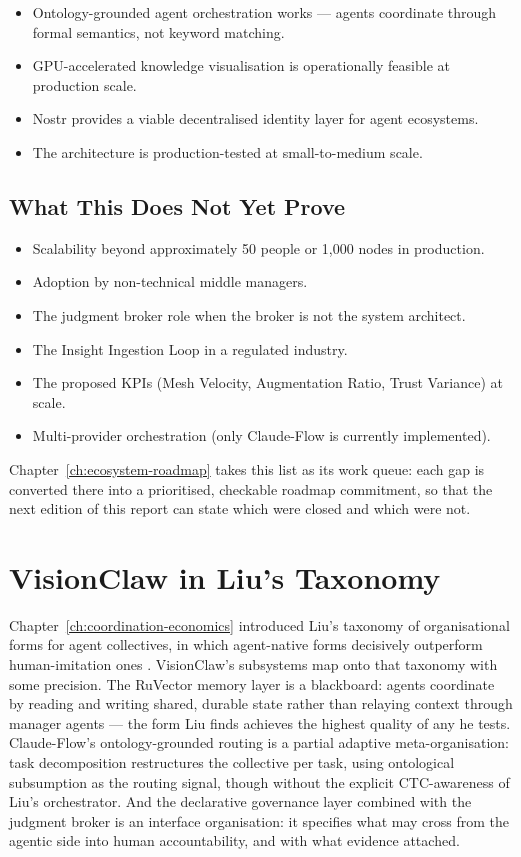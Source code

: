 \begin{itemize}
  \item Ontology-grounded agent orchestration works --- agents coordinate through formal semantics, not keyword matching.
  \item GPU-accelerated knowledge visualisation is operationally feasible at production scale.
  \item Nostr provides a viable decentralised identity layer for agent ecosystems.
  \item The architecture is production-tested at small-to-medium scale.
\end{itemize}

\subsection{What This Does Not Yet Prove}

\begin{itemize}
  \item Scalability beyond approximately 50 people or 1,000 nodes in production.
  \item Adoption by non-technical middle managers.
  \item The judgment broker role when the broker is not the system architect.
  \item The Insight Ingestion Loop in a regulated industry.
  \item The proposed KPIs (Mesh Velocity, Augmentation Ratio, Trust Variance) at scale.
  \item Multi-provider orchestration (only Claude-Flow is currently implemented).
\end{itemize}

Chapter~\ref{ch:ecosystem-roadmap} takes this list as its work queue: each gap is converted there into a prioritised, checkable roadmap commitment, so that the next edition of this report can state which were closed and which were not.

\section{VisionClaw in Liu's Taxonomy}

Chapter~\ref{ch:coordination-economics} introduced Liu's taxonomy of organisational forms for agent collectives, in which agent-native forms decisively outperform human-imitation ones \parencite{Liu2026}. VisionClaw's subsystems map onto that taxonomy with some precision. The RuVector memory layer is a blackboard: agents coordinate by reading and writing shared, durable state rather than relaying context through manager agents --- the form Liu finds achieves the highest quality of any he tests. Claude-Flow's ontology-grounded routing is a partial adaptive meta-organisation: task decomposition restructures the collective per task, using ontological subsumption as the routing signal, though without the explicit CTC-awareness of Liu's orchestrator. And the declarative governance layer combined with the judgment broker is an interface organisation: it specifies what may cross from the agentic side into human accountability, and with what evidence attached.

